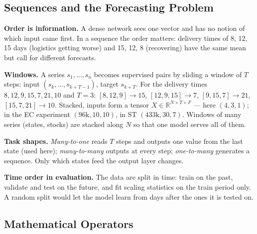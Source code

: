 \documentclass[11pt, a4paper]{article}
\begin{document}
\subsection{Sequences and the Forecasting Problem}
\label{sec:task}

\textbf{Order is information.} A dense network sees one vector and has no notion of which input came first. In a sequence the order matters: delivery times
of 8, 12, 15 days (logistics getting worse) and 15, 12, 8 (recovering) have the same mean but call for different forecasts.

\textbf{Windows.} A series $s_1,\dots,s_n$ becomes supervised pairs by sliding a window of $T$ steps: input $(s_k,\dots,s_{k+T-1})$, target $s_{k+T}$.
For the delivery times $8,12,9,15,7,21,10$ and $T=3$: $[8,12,9]\to15$, $[12,9,15]\to7$, $[9,15,7]\to21$, $[15,7,21]\to10$. Stacked, inputs form a tensor
$X\in\mathbb{R}^{N\times T\times F}$ — here $(4,3,1)$; in the EC experiment $(96\text{k},10,10)$, in ST $(433\text{k},30,7)$. Windows of many series (states, stocks) are stacked
along $N$ so that one model serves all of them.

\textbf{Task shapes.} \emph{Many-to-one} reads $T$ steps and outputs one value from the last state (used here); \emph{many-to-many} outputs at every step; \emph{one-to-many}
generates a sequence. Only which states feed the output layer changes.

\textbf{Time order in evaluation.} The data are split in time: train on the past, validate and test on the future, and fit scaling statistics on the train period only.
A random split would let the model learn from days after the ones it is tested on.

\subsection{Mathematical Operators}
\label{sec:ops}
\end{document}
